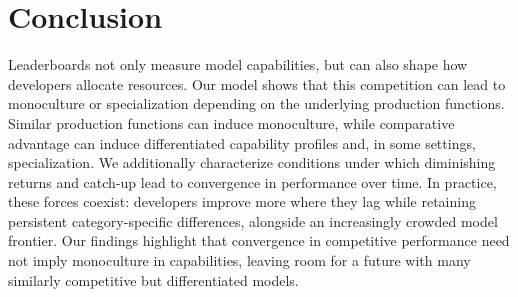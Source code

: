 \section{Conclusion}
Leaderboards not only measure model capabilities, but can also shape how developers allocate resources. 
Our model shows that this competition can lead to monoculture or specialization depending on the underlying production functions.
Similar production functions can induce monoculture, while comparative advantage can induce differentiated capability profiles and, in some settings, specialization.
We additionally characterize conditions under which diminishing returns and catch-up lead to convergence in performance over time.
In practice, these forces coexist: developers improve more where they lag while retaining persistent category-specific differences, alongside an increasingly crowded model frontier.
Our findings highlight that convergence in competitive performance need not imply monoculture in capabilities, leaving room for a future with many similarly competitive but differentiated models.
